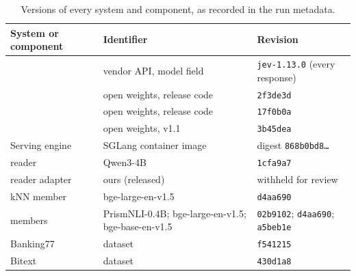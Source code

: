 \begin{table}[h]
\centering\small
\caption{Versions of every system and component, as recorded in the run metadata.}
\label{tab:versions}
\begin{tabular}{@{}lll@{}}
\toprule
System or component & Identifier & Revision \\
\midrule
\jev{} & vendor API, model field & \texttt{jev-1.13.0} (every response) \\ %
\clef{} & open weights, release code & \texttt{2f3de3d} \\ %
\flash{} & open weights, release code & \texttt{17f0b0a} \\ %
\pplx{} & open weights, v1.1 & \texttt{3b45dea} \\ %
Serving engine & SGLang container image & digest \texttt{868b0bd8\ldots} \\ %
\orb{} reader & Qwen3-4B & \texttt{1cfa9a7} \\ %
\orb{} reader adapter & ours (released) & withheld for review \\
\orb{} kNN member & bge-large-en-v1.5 & \texttt{d4aa690} \\ %
\gj{} members & PrismNLI-0.4B; bge-large-en-v1.5; bge-base-en-v1.5 & \texttt{02b9102}; \texttt{d4aa690}; \texttt{a5beb1e} \\ %
Banking77 & dataset & \texttt{f541215} \\ %
Bitext & dataset & \texttt{430d1a8} \\ %
\bottomrule
\end{tabular}
\end{table}

